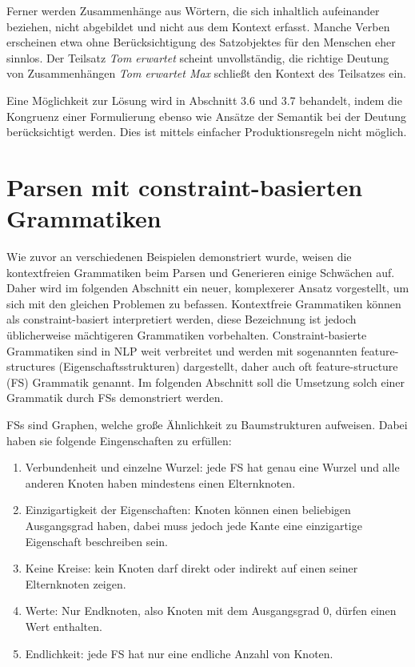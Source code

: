 \documentclass[12pt]{report}
\begin{document}
Ferner werden Zusammenhänge aus Wörtern, die sich inhaltlich aufeinander beziehen, nicht abgebildet und nicht aus dem Kontext erfasst. Manche Verben erscheinen etwa ohne Berücksichtigung des Satzobjektes für den Menschen eher sinnlos. Der Teilsatz \textit{\glqq  Tom erwartet\grqq{}} scheint unvollständig, die richtige Deutung von Zusammenhängen \textit{\glqq  Tom erwartet Max\grqq{}} schließt den Kontext des Teilsatzes ein.

Eine Möglichkeit zur Lösung wird in Abschnitt 3.6 und 3.7 behandelt, indem die Kongruenz einer Formulierung ebenso wie Ansätze der Semantik bei der Deutung berücksichtigt werden. Dies ist mittels einfacher Produktionsregeln nicht möglich.

\section{Parsen mit constraint-basierten Grammatiken}
Wie zuvor an verschiedenen Beispielen demonstriert wurde, weisen die kontextfreien Grammatiken beim Parsen und Generieren einige Schwächen auf. Daher wird im folgenden Abschnitt ein neuer, komplexerer Ansatz vorgestellt, um sich mit den gleichen Problemen zu befassen. Kontextfreie Grammatiken können als constraint-basiert interpretiert werden, diese Bezeichnung ist jedoch üblicherweise mächtigeren Grammatiken vorbehalten. Constraint-basierte Grammatiken sind in NLP weit verbreitet und werden mit sogenannten feature-structures (Eigenschaftsstrukturen) dargestellt, daher auch oft feature-structure (FS) Grammatik genannt. Im folgenden Abschnitt soll die Umsetzung solch einer Grammatik durch FSs demonstriert werden.

FSs sind Graphen, welche große Ähnlichkeit zu Baumstrukturen aufweisen. Dabei haben sie  folgende Eingenschaften zu erfüllen:

\begin{enumerate}
\item Verbundenheit und einzelne Wurzel: jede FS hat genau eine Wurzel und alle anderen Knoten haben mindestens einen Elternknoten.
\item Einzigartigkeit der Eigenschaften: Knoten können einen beliebigen Ausgangsgrad haben, dabei muss jedoch jede Kante eine einzigartige Eigenschaft beschreiben sein.
\item Keine Kreise: kein Knoten darf direkt oder indirekt auf einen seiner Elternknoten zeigen. 
\item Werte: Nur Endknoten, also Knoten mit dem Ausgangsgrad 0, dürfen einen Wert enthalten. 
\item Endlichkeit: jede FS hat nur eine endliche Anzahl von Knoten.
\end{enumerate}
\end{document}

